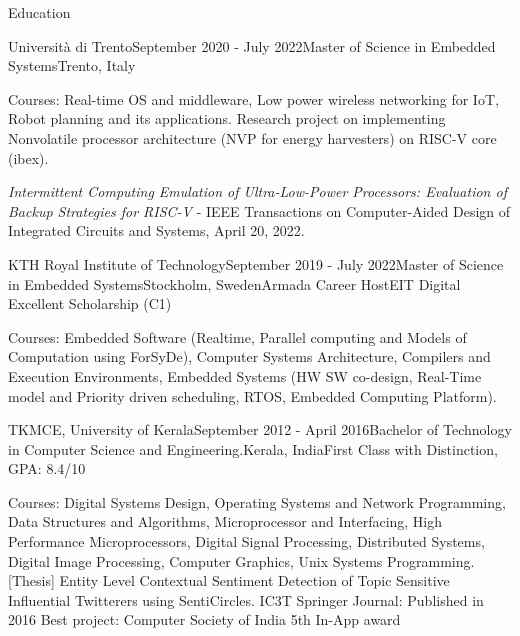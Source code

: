 \documentclass[
	11pt, %
]{resume} %
\begin{document}

\begin{rSection}{Education}
    \begin{rSubsection}{Università di Trento}{September 2020 - July 2022}{Master of Science in Embedded Systems}{Trento, Italy}

        Courses: Real-time OS and middleware, Low power wireless networking for IoT, Robot planning and its applications. Research project on implementing Nonvolatile processor architecture (NVP for energy harvesters) on RISC-V core (ibex).
    
        {\color{orange}\emph{Intermittent Computing Emulation of Ultra-Low-Power Processors: Evaluation of Backup Strategies for RISC-V} - IEEE Transactions on Computer-Aided Design of Integrated Circuits and Systems, April 20, 2022}.
    \end{rSubsection}

    \begin{rSubsection6}{KTH Royal Institute of Technology}{September 2019 - July 2022}{Master of Science in Embedded Systems}{Stockholm, Sweden}{Armada Career Host}{EIT Digital Excellent Scholarship (C1)}

        Courses: Embedded Software (Realtime, Parallel computing and Models of Computation using ForSyDe), Computer Systems Architecture, Compilers and Execution Environments, Embedded Systems (HW SW co-design, Real-Time model and Priority driven scheduling, RTOS, Embedded Computing Platform).
    \end{rSubsection6}
    
    \begin{rSubsection5}{TKMCE, University of Kerala}{September 2012 - April 2016}{Bachelor of Technology in Computer Science and Engineering.}{Kerala, India}{First Class with Distinction, GPA: 8.4/10}

        Courses: Digital Systems Design, Operating Systems and Network Programming, Data Structures and Algorithms, Microprocessor and Interfacing, High Performance Microprocessors, Digital Signal Processing, Distributed Systems, Digital Image Processing, Computer Graphics, Unix Systems Programming.\hfill
        \bigskip\break
        {\color{orange}[Thesis] Entity Level Contextual Sentiment Detection of Topic Sensitive Influential Twitterers using SentiCircles. \break
        IC3T Springer Journal: Published in 2016 \hfill \break
        Best project: Computer Society of India 5th In-App award} \hfill

    
    \end{rSubsection5}
    
		
\end{rSection}
\end{document}
